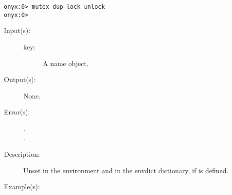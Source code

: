 \begin{description}
\begin{description}
\begin{verbatim}
onyx:0> mutex dup lock unlock
onyx:0>
		\end{verbatim}
	\end{description}
\label{systemdict:unsetenv}
\item[{\onyxop{key}{unsetenv}{--}}: ]
	\begin{description}\item[]
	\item[Input(s): ]
		\begin{description}\item[]
		\item[key: ]
			A name object.
		\end{description}
	\item[Output(s): ] None.
	\item[Error(s): ]
		\begin{description}\item[]
		\item[.]
		\item[.]
		\end{description}
	\item[Description: ]
		Unset  in the environment and in the envdict
		dictionary, if  is defined.
	\item[Example(s): ]\begin{verbatim}


\end{verbatim}
\end{description}
\end{description}
